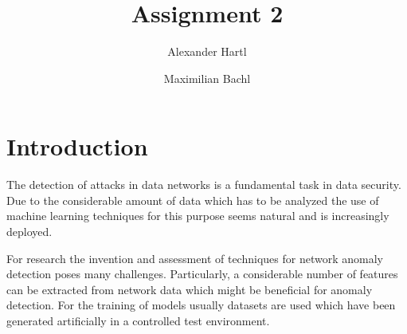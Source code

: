 \documentclass[sigconf,nonacm]{acmart}
\begin{document}
\title{Assignment 2}

\author{Alexander Hartl}

\author{Maximilian Bachl}
\authornotemark[1]

\renewcommand{\shortauthors}{Hartl and Bachl}


\maketitle

\section{Introduction}
The detection of attacks in data networks is a fundamental task in data security. Due to the considerable amount of data which has to be analyzed the use of machine learning techniques for this purpose seems natural and is increasingly deployed.

For research the invention and assessment of techniques for network anomaly detection poses many challenges. Particularly, a considerable number of features can be extracted from network data which might be beneficial for anomaly detection. For the training of models usually datasets are used which have been generated artificially in a controlled test environment. 
\end{document}
